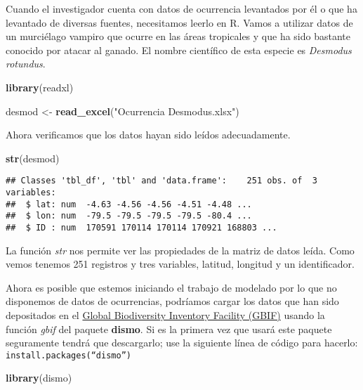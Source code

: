 \documentclass[]{article}
\newenvironment{Shaded}{\begin{snugshade}}{\end{snugshade}}
\newcommand{\KeywordTok}[1]{\textcolor[rgb]{0.13,0.29,0.53}{\textbf{{#1}}}}
\newcommand{\StringTok}[1]{\textcolor[rgb]{0.31,0.60,0.02}{{#1}}}
\newcommand{\NormalTok}[1]{{#1}}
\begin{document}
Cuando el investigador cuenta con datos de ocurrencia levantados por él
o que ha levantado de diversas fuentes, necesitamos leerlo en R. Vamos a
utilizar datos de un murciélago vampiro que ocurre en las áreas
tropicales y que ha sido bastante conocido por atacar al ganado. El
nombre científico de esta especie es \emph{Desmodus rotundus}.

\begin{Shaded}
\begin{Highlighting}[]
\KeywordTok{library}\NormalTok{(readxl)}

\NormalTok{desmod <-}\StringTok{ }\KeywordTok{read_excel}\NormalTok{(}\StringTok{"Ocurrencia Desmodus.xlsx"}\NormalTok{)}
\end{Highlighting}
\end{Shaded}

Ahora verificamos que los datos hayan sido leídos adecuadamente.

\begin{Shaded}
\begin{Highlighting}[]
\KeywordTok{str}\NormalTok{(desmod)}
\end{Highlighting}
\end{Shaded}

\begin{verbatim}
## Classes 'tbl_df', 'tbl' and 'data.frame':    251 obs. of  3 variables:
##  $ lat: num  -4.63 -4.56 -4.56 -4.51 -4.48 ...
##  $ lon: num  -79.5 -79.5 -79.5 -79.5 -80.4 ...
##  $ ID : num  170591 170114 170114 170921 168803 ...
\end{verbatim}

La función \emph{str} nos permite ver las propiedades de la matriz de
datos leída. Como vemos tenemos 251 registros y tres variables, latitud,
longitud y un identificador.

Ahora es posible que estemos iniciando el trabajo de modelado por lo que
no disponemos de datos de ocurrencias, podríamos cargar los datos que
han sido depositados en el \href{https://www.gbif.org/}{Global
Biodiversity Inventory Facility (GBIF)} usando la función \emph{gbif}
del paquete \textbf{dismo}. Si es la primera vez que usará este paquete
seguramente tendrá que descargarlo; use la siguiente línea de código
para hacerlo: \texttt{install.packages(“dismo”)}

\begin{Shaded}
\begin{Highlighting}[]
\KeywordTok{library}\NormalTok{(dismo)}
\end{Highlighting}
\end{Shaded}
\end{document}
